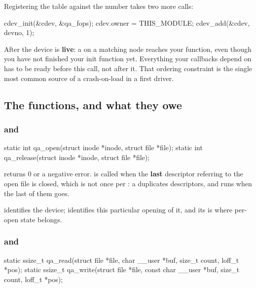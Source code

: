 Registering the table against the number takes two more calls:

\begin{ccode}
cdev_init(&cdev, &qa_fops);
cdev.owner = THIS_MODULE;
cdev_add(&cdev, devno, 1);
\end{ccode}

\noindent After  the device is \textbf{live}: a  on a matching node
reaches your function, even though you have not finished your init function yet. Everything your
callbacks depend on has to be ready before this call, not after it. That ordering constraint is the
single most common source of a crash-on-load in a first driver.

\subsection{The functions, and what they owe}
\label{c5:app:a4}

\subsubsection{ and }
\label{c5:app:a:open-and-release}

\begin{ccode}
static int qa_open(struct inode *inode, struct file *file);
static int qa_release(struct inode *inode, struct file *file);
\end{ccode}

\noindent {} returns 0 or a negative error.  is called when the \textbf{last}
descriptor referring to the open file is closed, which is not once per : a 
duplicates descriptors, and  runs when the last of them goes.

 identifies the device;  identifies this particular opening of it, and its
 is where per-open state belongs.

\subsubsection{ and }
\label{c5:app:a:read-and-write}

\begin{ccode}
static ssize_t qa_read(struct file *file, char __user *buf, size_t count, loff_t *pos);
static ssize_t qa_write(struct file *file, const char __user *buf, size_t count, loff_t *pos);
\end{ccode}

